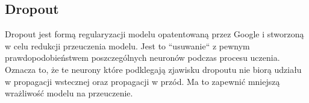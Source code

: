 \subsection{Dropout}

Dropout jest formą regularyzacji modelu opatentowaną przez Google i stworzoną w celu redukcji 
przeuczenia modelu. Jest to ``usuwanie`` z pewnym prawdopodobieństwem poszczególnych neuronów 
podczas procesu uczenia. Oznacza to, że te neurony które podklegają zjawisku dropoutu 
nie biorą udziału w propagacji wstecznej oraz propagacji w przód. Ma to zapewnić 
mniejszą wrażliwość modelu na przeuczenie. 
